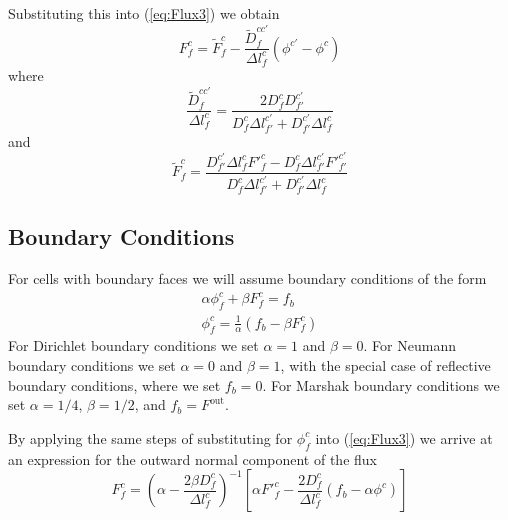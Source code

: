 \documentclass{article}
\newcommand{\bfunc}{\ensuremath{f_{b}}}
\begin{document}
Substituting this into (\ref{eq:Flux3}) we obtain
\begin{equation}
    \boxed{
        F^{c}_{f} = 
        \tilde{F}^{c}_{f} -  \frac{\tilde{D}^{cc'}_{f}}{\Delta l^{c}_{f}}
                             \left( \phi^{c'} - \phi^{c} \right)
    }
\label{eq:Finterior}
\end{equation}
where
\begin{equation}
        \frac{\tilde{D}^{cc'}_{f}}{\Delta l^{c}_{f}}
                    = \frac{
                         2 D^{c}_{f} D^{c'}_{f'} 
                       }
                       {
                           D^{c}_{f}   \Delta l^{c'}_{f'}
                        +  D^{c'}_{f'} \Delta l^{c}_{f}
                       }
\end{equation}
and
\begin{equation}
    \tilde{F}^{c}_{f} = \frac
                        { D^{c'}_{f'} \Delta l^{c}_{f} {F'}^{c}_{f}
                            - D^{c}_{f} \Delta l^{c'}_{f'} {F'}^{c'}_{f'}
                        }
                        { D^{c}_{f} \Delta l^{c'}_{f'}
                            + D^{c'}_{f'} \Delta l^{c}_{f}
                        }
\end{equation}

\subsection{Boundary Conditions}

For cells with boundary faces we will assume boundary conditions of the
form
\begin{gather}
        \alpha \phi^{c}_{f} + \beta F^{c}_{f} = \bfunc
  \\
        \phi^{c}_{f} = \frac{1}{\alpha} \left( \bfunc - \beta F^{c}_{f} \right)
\label{eq:phicf_bc}
\end{gather}
For Dirichlet boundary conditions we set $\alpha=1$ and $\beta=0$.
For Neumann boundary conditions we set $\alpha=0$ and $\beta=1$,
 with the special
case of reflective boundary conditions, where we set $\bfunc = 0$.
For Marshak boundary conditions we set $\alpha=1/4$, $\beta=1/2$, and
$\bfunc = F^{\text{out}}$.

By applying the same steps of substituting for $\phi^{c}_{f}$ into
(\ref{eq:Flux3})
we arrive at an expression for the outward normal component of the flux
\begin{equation}
   \boxed{
        F^{c}_{f} = \left( \alpha - \frac{2 \beta D^{c}_{f}}{\Delta l^{c}_{f}}
                    \right)^{-1}
                    \left[ \alpha {F'}^{c}_{f} - \frac{2 D^{c}_{f}}{\Delta l^{c}_{f}}
                                                \left(\bfunc - \alpha \phi^{c}\right)
                    \right]
   }
\label{eq:Fboundary}
\end{equation}
\end{document}
